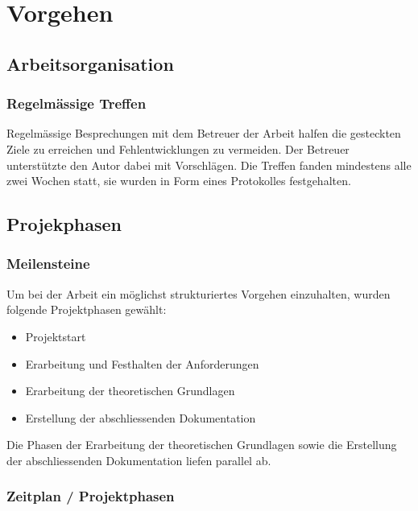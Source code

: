 
\chapter{Vorgehen}
\label{chap:procedure}

\section{Arbeitsorganisation}
\label{sec:organization}

\subsection{Regelmässige Treffen}
\label{subsec:meetings}

Regelmässige Besprechungen mit dem Betreuer der Arbeit halfen die
gesteckten Ziele zu erreichen und Fehlentwicklungen zu vermeiden. Der
Betreuer unterstützte den Autor dabei mit Vorschlägen. Die Treffen
fanden mindestens alle zwei Wochen statt, sie wurden in Form eines
Protokolles festgehalten.

\section{Projekphasen}
\label{sec:project_schedule}

\subsection{Meilensteine}
\label{subsec:milestones}

Um bei der Arbeit ein möglichst strukturiertes Vorgehen einzuhalten, wurden folgende Projektphasen gewählt:
\begin{itemize}
    \item Projektstart
    \item Erarbeitung und Festhalten der Anforderungen
    \item Erarbeitung der theoretischen Grundlagen
    \item Erstellung der abschliessenden Dokumentation
\end{itemize}

Die Phasen der Erarbeitung der theoretischen Grundlagen sowie die Erstellung der abschliessenden Dokumentation liefen parallel ab.

\subsection{Zeitplan / Projektphasen}
\label{subsec:timeschedule}

